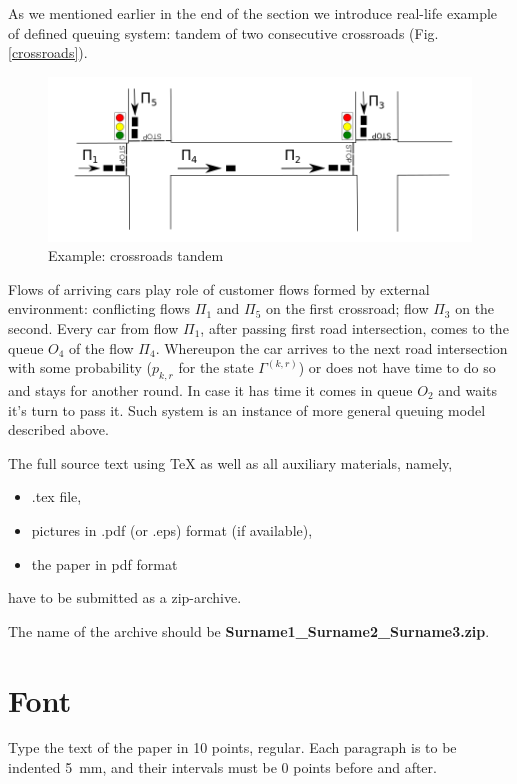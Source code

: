 \documentclass[10pt]{article}
\begin{document}
As we mentioned earlier in the end of the section we introduce real-life example of defined queuing system: tandem of two consecutive crossroads (Fig. \ref{crossroads}). 
\begin{figure}[h!]
   \centering
    \includegraphics[width=\textwidth]{Crossroads.png} %
    \caption {Example: crossroads tandem}
    \label{pic1}
\end{figure}
Flows of arriving cars play role of customer flows formed by external environment: conflicting flows $\Pi_1$ and $\Pi_5$ on the first crossroad; flow $\Pi_3$ on the second. Every car from flow $\Pi_1$, after passing first road intersection, comes to the queue $O_4$ of the flow $\Pi_4$. Whereupon the car arrives to the next road intersection with some probability ($p_{k,r}$ for the state $\Gamma^{(k,r)}$) or does not have time to do so and stays for another round. In case it has time it comes in queue $O_2$ and waits it's turn to pass it. Such system is an instance of more general queuing model described above.



The full source text using \TeX{} as well as all auxiliary
materials, namely,
\begin{itemize}
  \item .tex file,
  \item pictures in .pdf (or .eps) format (if available),
  \item the paper in pdf format
\end{itemize}
have to be submitted as a zip-archive.

The name of the archive should be
\textbf{Surname1\_Surname2\_Surname3.zip}.

\section{Font}

Type the text of the paper in 10 points, regular. Each
paragraph is to be indented 5~mm, and their intervals must be 0
points before and after.
\end{document}
